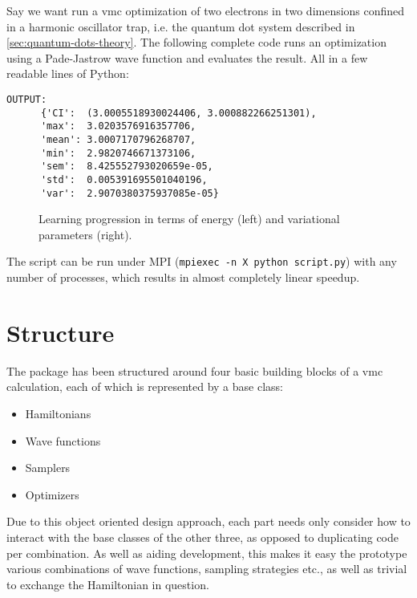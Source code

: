 \documentclass[Thesis.tex]{subfiles}
\begin{document}
Say we want run a \gls{vmc} optimization of two electrons in two
dimensions confined in a harmonic oscillator trap, i.e. the quantum dot system
described in \cref{sec:quantum-dots-theory}. The following complete code runs an
optimization using a Pade-Jastrow wave function and evaluates the result. All in
a few readable lines of Python:\\



\begin{lstlisting}[basicstyle=\scriptsize]
  OUTPUT:
      {'CI':  (3.0005518930024406, 3.000882266251301),
      'max':  3.0203576916357706,
      'mean': 3.0007170796268707,
      'min':  2.9820746671373106,
      'sem':  8.425552793020659e-05,
      'std':  0.005391695501040196,
      'var':  2.9070380375937085e-05}
\end{lstlisting}

\begin{figure}[h]
  \centering
  \resizebox{\linewidth}{!}{%
      
  }
  \caption[Learning progression of an example \gls{vmc} optimization]{Learning progression in terms of energy (left) and variational
    parameters (right).}
  \label{fig:quickstart-example}
\end{figure}

\noindent The script can be run under MPI (\texttt{mpiexec -n X python script.py}) with any number of processes, which results in almost completely linear speedup.

\section{Structure}

The package has been structured around four basic building blocks of a \gls{vmc}
calculation, each of which is represented by a base class:

\begin{itemize}
\item Hamiltonians
\item Wave functions
\item Samplers
\item Optimizers
\end{itemize}

Due to this object oriented design approach, each part needs only consider how
to interact with the base classes of the other three, as opposed to duplicating
code per combination. As well as aiding development, this makes it easy the
prototype various combinations of wave functions, sampling strategies etc., as
well as trivial to exchange the Hamiltonian in question.
\end{document}
